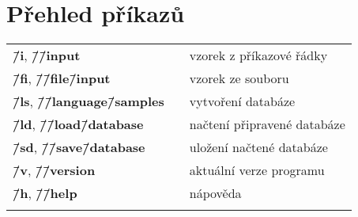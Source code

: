 \documentclass[11pt]{article}
\begin{document}
\section{Přehled příkazů}
\begin{center}
\begin{tabular}{ l l l }
 \textbf{\=/i}, \textbf{\=/\=/input} 				& & vzorek z příkazové řádky \\ 
 \textbf{\=/fi}, \textbf{\=/\=/file\=/input} 		& & vzorek ze souboru \\  
 \textbf{\=/ls}, \textbf{\=/\=/language\=/samples} 	& & vytvoření databáze \\
 \textbf{\=/ld}, \textbf{\=/\=/load\=/database} 	& & načtení připravené databáze \\
 \textbf{\=/sd}, \textbf{\=/\=/save\=/database} 	& & uložení načtené databáze \\
 \textbf{\=/v}, \textbf{\=/\=/version} 				& & aktuální verze programu \\
 \textbf{\=/h}, \textbf{\=/\=/help} 				& & nápověda \\
 & \hspace{100pt} &  \\
\end{tabular}
\end{center}
\end{document}
